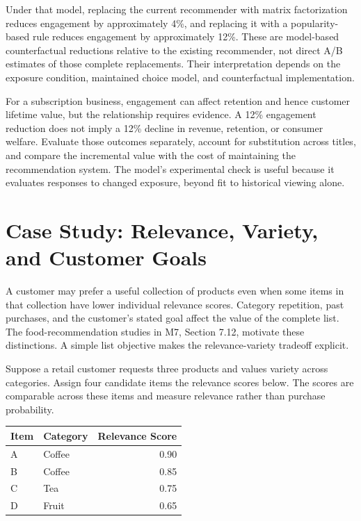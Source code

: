 Under that model, replacing the current recommender with matrix
factorization reduces engagement by approximately 4\%, and replacing it
with a popularity-based rule reduces engagement by approximately 12\%.
These are model-based counterfactual reductions relative to the existing
recommender, not direct A/B estimates of those complete replacements.
Their interpretation depends on the exposure condition, maintained
choice model, and counterfactual implementation.

For a subscription business, engagement can affect retention and hence
customer lifetime value, but the relationship requires evidence. A 12\%
engagement reduction does not imply a 12\% decline in revenue,
retention, or consumer welfare. Evaluate those outcomes separately,
account for substitution across titles, and compare the incremental
value with the cost of maintaining the recommendation system. The
model's experimental check is useful because it evaluates responses to
changed exposure, beyond fit to historical viewing alone.

\hypertarget{M08-case-study-relevance-variety-and-customer-goals}{%
\section{Case Study: Relevance, Variety, and Customer
Goals}\label{M08-case-study-relevance-variety-and-customer-goals}}

\noindent A customer may prefer a useful collection of products even when some
items in that collection have lower individual relevance scores.
Category repetition, past purchases, and the customer's stated goal
affect the value of the complete list. The food-recommendation studies
in M7, Section 7.12, motivate these distinctions. A simple list
objective makes the relevance-variety tradeoff explicit.

Suppose a retail customer requests three products and values variety
across categories. Assign four candidate items the relevance scores
below. The scores are comparable across these items and measure
relevance rather than purchase probability.

\begin{table}[H]
\centering\small
\begin{tabular}{@{}llr@{}}
\toprule
Item & Category & Relevance Score \\
\midrule

A & Coffee & 0.90 \\
B & Coffee & 0.85 \\
C & Tea & 0.75 \\
D & Fruit & 0.65 \\
\bottomrule
\end{tabular}
\end{table}

